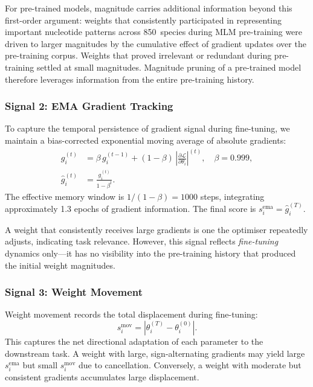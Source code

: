 \documentclass[journal]{IEEEtran}
\begin{document}
For pre-trained models, magnitude carries additional information
beyond this first-order argument: weights that consistently
participated in representing important nucleotide patterns
across 850~species during MLM pre-training were driven to larger
magnitudes by the cumulative effect of gradient updates over
the pre-training corpus.
Weights that proved irrelevant or redundant during pre-training
settled at small magnitudes.
Magnitude pruning of a pre-trained model therefore leverages
information from the entire pre-training history.

\subsubsection{Signal 2: EMA Gradient Tracking}

To capture the temporal persistence of gradient signal during
fine-tuning, we maintain a bias-corrected exponential moving
average of absolute gradients:
\begin{align}
  g_i^{(t)} &= \beta\, g_i^{(t-1)}
  + (1 - \beta)\,
  \left|\frac{\partial \mathcal{L}}{\partial \theta_i}\right|^{(t)},
  \quad \beta = 0.999,
  \label{eq:ema} \\
  \hat{g}_i^{(t)} &= \frac{g_i^{(t)}}{1 - \beta^t}.
  \label{eq:ema_bias}
\end{align}
The effective memory window is $1/(1-\beta) = 1000$ steps,
integrating approximately 1.3 epochs of gradient information.
The final score is $s_i^{\text{ema}} = \hat{g}_i^{(T)}$.

A weight that consistently receives large gradients is one
the optimiser repeatedly adjusts, indicating task relevance.
However, this signal reflects \emph{fine-tuning} dynamics
only---it has no visibility into the pre-training history
that produced the initial weight magnitudes.

\subsubsection{Signal 3: Weight Movement}

Weight movement records the total displacement during
fine-tuning:
\begin{equation}
  s_i^{\text{mov}} = |\theta_i^{(T)} - \theta_i^{(0)}|.
  \label{eq:movement}
\end{equation}
This captures the net directional adaptation of each parameter
to the downstream task.
A weight with large, sign-alternating gradients may yield
large $s_i^{\text{ema}}$ but small $s_i^{\text{mov}}$ due to
cancellation.
Conversely, a weight with moderate but consistent gradients
accumulates large displacement.
\end{document}
